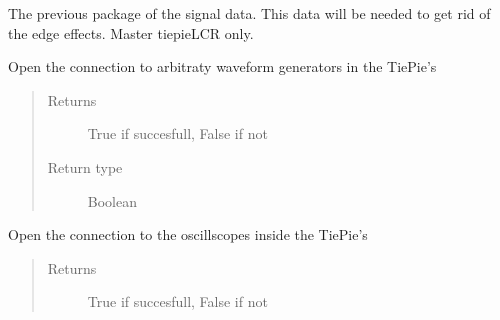 \documentclass[letterpaper,10pt,english]{sphinxmanual}
\begin{document}
\begin{fulllineitems}
\begin{fulllineitems}
\end{fulllineitems}


\begin{fulllineitems}
\label{\detokenize{index:TiePieLCR.TiePieLCR.old_signal_data}}
\sphinxAtStartPar
The previous package of the signal data. This data will be needed to get rid of the edge effects. Master tiepieLCR only.

\end{fulllineitems}


\begin{fulllineitems}
\label{\detokenize{index:TiePieLCR.TiePieLCR.open_gen}}
\sphinxAtStartPar
Open the connection to arbitraty waveform generators in the TiePie’s
\begin{quote}\begin{description}
\item[{Returns}] \leavevmode
\sphinxAtStartPar
True if succesfull, False if not

\item[{Return type}] \leavevmode
\sphinxAtStartPar
Boolean

\end{description}\end{quote}

\end{fulllineitems}


\begin{fulllineitems}
\label{\detokenize{index:TiePieLCR.TiePieLCR.open_scope}}
\sphinxAtStartPar
Open the connection to the oscillscopes inside the TiePie’s
\begin{quote}\begin{description}
\item[{Returns}] \leavevmode
\sphinxAtStartPar
True if succesfull, False if not


\end{description}
\end{quote}
\end{fulllineitems}
\end{fulllineitems}
\end{document}
